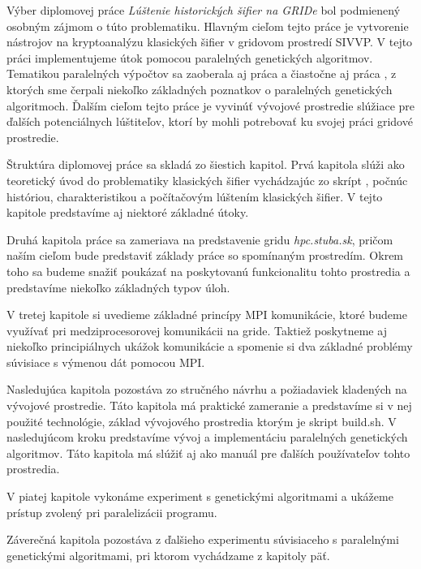 
Výber diplomovej práce \textit{Lúštenie historických šifier na GRIDe} bol podmienený osobným zájmom o túto problematiku.
Hlavným cieľom tejto práce je vytvorenie nástrojov na kryptoanalýzu klasických šifier v gridovom prostredí SIVVP.
V tejto práci implementujeme útok pomocou paralelných genetických algoritmov.
Tematikou paralelných výpočtov sa zaoberala aj práca \cite{pea} a čiastočne aj práca \cite{ev}, z ktorých sme čerpali niekoľko základných poznatkov o paralelných genetických algoritmoch.
Ďalším cieľom tejto práce je vyvinúť vývojové prostredie slúžiace pre ďalších potenciálnych lúštiteľov, ktorí by mohli potrebovať ku svojej práci gridové prostredie.

Štruktúra diplomovej práce sa skladá zo šiestich kapitol.
Prvá kapitola slúži ako teoretický úvod do problematiky klasických šifier vychádzajúc zo skrípt \cite{ks}, počnúc históriou, charakteristikou a počítačovým lúštením klasických šifier. V tejto kapitole predstavíme aj niektoré základné útoky.

Druhá kapitola práce sa zameriava na predstavenie gridu \textit{hpc.stuba.sk}, pričom naším cieľom bude predstaviť základy práce so spomínaným prostredím.
Okrem toho sa budeme snažiť poukázať na poskytovanú funkcionalitu tohto prostredia a predstavíme niekoľko základných typov úloh.

V tretej kapitole si uvedieme základné princípy MPI komunikácie, ktoré budeme využívať pri medziprocesorovej komunikácii na gride.
Taktiež poskytneme aj niekoľko principiálnych ukážok komunikácie a spomenie si dva základné problémy súvisiace s výmenou dát pomocou MPI.

Nasledujúca kapitola pozostáva zo stručného návrhu a požiadaviek kladených na vývojové prostredie.
Táto kapitola má praktické zameranie a predstavíme si v nej použité technológie, základ vývojového prostredia ktorým je skript build.sh.
V nasledujúcom kroku predstavíme vývoj a implementáciu paralelných genetických algoritmov. Táto kapitola má slúžiť aj ako manuál
pre ďalších používateľov tohto prostredia.

V piatej kapitole vykonáme experiment s genetickými algoritmami a ukážeme prístup zvolený pri paralelizácii programu.

Záverečná kapitola pozostáva z ďalšieho experimentu súvisiaceho s paralelnými genetickými algoritmami, pri ktorom vychádzame z kapitoly päť.

